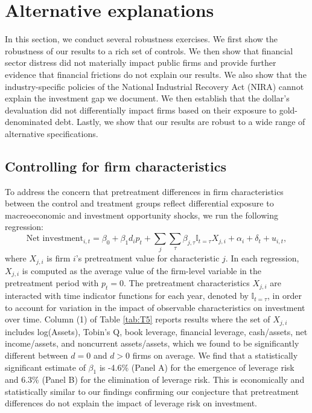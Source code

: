 \section{Alternative explanations}
\label{sec:alternative_explanations}

In this section, we conduct several robustness exercises. We first show the robustness of our results to a rich set of controls. We then show that financial sector distress did not materially impact public firms and provide further evidence that financial frictions do not explain our results. We also show that the industry-specific policies of the National Industrial Recovery Act (NIRA) cannot explain the investment gap we document. We then establish that the dollar's devaluation did not differentially impact firms based on their exposure to gold-denominated debt. Lastly, we show that our results are robust to a wide range of alternative specifications.

\subsection{Controlling for firm characteristics}
\label{sec:control}

To address the concern that pretreatment differences in firm characteristics between the control and treatment groups reflect differential exposure to macreoeconomic and investment opportunity shocks, we run the following regression:
\begin{equation}
\label{eq:control}
\text{Net investment}_{i,t} = \beta_0 + \beta_1 d_i p_t +  \sum_j  \sum_{\tau} \beta_{j,\tau}  \mathbb{I}_{t = \tau} X_{j,i} + \alpha_i  + \delta_t+ u_{i,t}, 
\end{equation}
where $X_{j,i}$ is firm $i$'s pretreatment value for characteristic $j$. In each regression, $X_{j,i}$ is computed as the average value of the firm-level variable in the pretreatment period with $p_t = 0$. The pretreatment characteristics $X_{j,i}$ are interacted with time indicator functions for each year, denoted by $\mathbb{I}_{t = \tau}$, in order to account for variation in the impact of observable characteristics on investment over time. Column (1) of Table \ref{tab:T5} reports results where the set of $X_{j,i}$ includes log(Assets), Tobin's Q, book leverage, financial leverage, cash/assets, net income/assets, and noncurrent assets/assets, which we found to be significantly different between $d = 0$ and $d > 0$ firms on average. We find that a statistically significant estimate of $\beta_1$ is -4.6\% (Panel A) for the emergence of leverage risk and 6.3\% (Panel B) for the elimination of leverage risk. This is economically and statistically similar to our findings  confirming our conjecture that pretreatment differences do not explain the impact of leverage risk on investment.  

